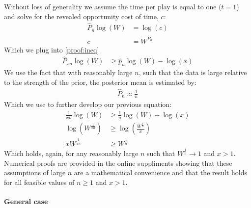 \documentclass[a4paper,12pt]{article}
\begin{document}
\begin{appendices}
Without loss of generality we assume the time per play is equal to one ($t = 1$) and solve for the revealed opportunity cost of time, $c$:
%
\begin{align*}
  \hat{P}_{n} \log(W) &= \log(c) \\
  c &= W^{\hat{P}_n}
\end{align*}
%
Which we plug into \ref{proof:ineq}
\begin{align*}
  \hat{P}_{xn} \log(W) &\geq \hat{p}_n \log(W) - \log(x)
\end{align*}
We use the fact that with reasonably large $n$, such that the data is large relative to the strength of the prior, the posterior mean is estimated by:
\begin{align*}
  \hat{P}_n \approx \frac{1}{n}
\end{align*}
Which we use to further develop our previous equation:
\begin{align*}
  \frac{1}{xn} \log(W) &\geq \frac{1}{n} \log(W) - \log(x) \\
 \log \left( W^{\frac{1}{xn}} \right) &\geq \log \left( \frac{W^{\frac{1}{n}}}{x} \right) \\
  x W^{\frac{1}{xn}} &\geq W^{\frac{1}{n}}
\end{align*}
Which holds, again, for any reasonably large $n$ such that $W^{\frac{1}{n}} \rightarrow 1$ and $x > 1$. Numerical proofs are provided in the online suppliments showing that these assumptions of large $n$ are a mathematical convenience and that the result holds for all feasible values of $n \geq 1$ and $x > 1$.

\paragraph{General case}


\end{appendices}
\end{document}
